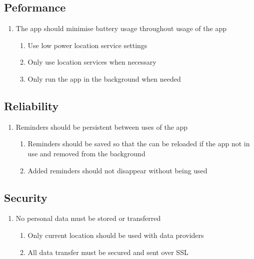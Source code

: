 \documentclass[12pt]{report}
\begin{document}
\subsection{Peformance}

\begin{enumerate}[label*=\arabic*.]

\item{The app should minimise battery usage throughout usage of the app}
     \begin{enumerate}[label*=\arabic*.]
        \item{Use low power location service settings}
        \item{Only use location services when necessary}
        \item{Only run the app in the background when needed}
    \end{enumerate}
    
\end{enumerate}

\subsection{Reliability}

\begin{enumerate}[label*=\arabic*.]

\item{Reminders should be persistent between uses of the app}
     \begin{enumerate}[label*=\arabic*.]
        \item{Reminders should be saved so that the can be reloaded if the app not in use and removed from the background}
        \item{Added reminders should not disappear without being used}
    \end{enumerate}
    
\end{enumerate}

\subsection{Security}

\begin{enumerate}[label*=\arabic*.]

\item{No personal data must be stored or transferred}
     \begin{enumerate}[label*=\arabic*.]
        \item{Only current location should be used with data providers}
        \item{All data transfer must be secured and sent over SSL}
    \end{enumerate}
    
\end{enumerate}
\end{document}
